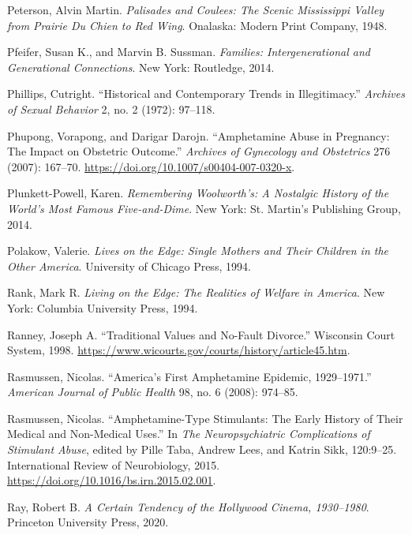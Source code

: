 \documentclass[
  american,
  letterpaper,
]{book}
\newlength{\cslhangindent}
\newenvironment{CSLReferences}[2] %
 {\begin{list}{}{%
  \setlength{\itemindent}{0pt}
  \setlength{\leftmargin}{0pt}
  \setlength{\parsep}{0pt}
  \ifodd #1
   \setlength{\leftmargin}{\cslhangindent}
   \setlength{\itemindent}{-1\cslhangindent}
  \fi
  \setlength{\itemsep}{#2\baselineskip}}}
 {\end{list}}
\begin{document}
\begin{CSLReferences}{1}{0}
Peterson, Alvin Martin. \emph{Palisades and Coulees: The Scenic
Mississippi Valley from Prairie Du Chien to Red Wing}. Onalaska: Modern
Print Company, 1948.

Pfeifer, Susan K., and Marvin B. Sussman. \emph{Families:
Intergenerational and Generational Connections}. New York: Routledge,
2014.

Phillips, Cutright. {``Historical and Contemporary Trends in
Illegitimacy.''} \emph{Archives of Sexual Behavior} 2, no. 2 (1972):
97--118.

Phupong, Vorapong, and Darigar Darojn. {``Amphetamine Abuse in
Pregnancy: The Impact on Obstetric Outcome.''} \emph{Archives of
Gynecology and Obstetrics} 276 (2007): 167--70.
\url{https://doi.org/10.1007/s00404-007-0320-x}.

Plunkett-Powell, Karen. \emph{Remembering Woolworth's: A Nostalgic
History of the World's Most Famous Five-and-Dime}. New York: St.
Martin's Publishing Group, 2014.

Polakow, Valerie. \emph{Lives on the Edge: Single Mothers and Their
Children in the Other America}. University of Chicago Press, 1994.

Rank, Mark R. \emph{Living on the Edge: The Realities of Welfare in
America}. New York: Columbia University Press, 1994.

Ranney, Joseph A. {``Traditional Values and No-Fault Divorce.''}
Wisconsin Court System, 1998.
\url{https://www.wicourts.gov/courts/history/article45.htm}.

Rasmussen, Nicolas. {``America's First Amphetamine Epidemic,
1929--1971.''} \emph{American Journal of Public Health} 98, no. 6
(2008): 974--85.

Rasmussen, Nicolas. {``Amphetamine-Type Stimulants: The Early History of
Their Medical and Non-Medical Uses.''} In \emph{The Neuropsychiatric
Complications of Stimulant Abuse}, edited by Pille Taba, Andrew Lees,
and Katrin Sikk, 120:9--25. International Review of Neurobiology, 2015.
\url{https://doi.org/10.1016/bs.irn.2015.02.001}.

Ray, Robert B. \emph{A Certain Tendency of the Hollywood Cinema,
1930--1980}. Princeton University Press, 2020.


\end{CSLReferences}
\end{document}
